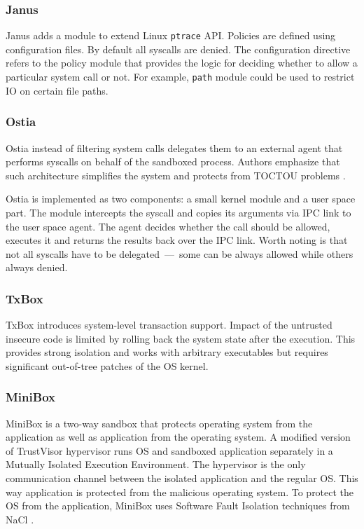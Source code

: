 \documentclass[en]{pracamgr}
\begin{document}
\subsubsection{Janus}
Janus \cite{garfinkel2004janus} adds a module to extend Linux \texttt{ptrace} API. Policies are defined using configuration files. By default all syscalls are denied. The configuration directive refers to the policy module that provides the logic for deciding whether to allow a particular system call or not. For example, \texttt{path} module could be used to restrict IO on certain file paths.

\subsubsection{Ostia}
Ostia \cite{garfinkel2004ostia} instead of filtering system calls delegates them to an external agent that performs syscalls on behalf of the sandboxed process. Authors emphasize that such architecture simplifies the system and protects from TOCTOU problems \cite{cwe_toctou}.

Ostia is implemented as two components: a small kernel module and a user space part. The module intercepts the syscall and copies its arguments via IPC link to the user space agent. The agent decides whether the call should be allowed, executes it and returns the results back over the IPC link. Worth noting is that not all syscalls have to be delegated~---~some can be always allowed while others always denied.

\subsubsection{TxBox}
TxBox \cite{jana2011txbox} introduces system-level transaction support. Impact of the untrusted insecure code is limited by rolling back the system state after the execution. This provides strong isolation and works with arbitrary executables but requires significant out-of-tree patches of the OS kernel.

\subsubsection{MiniBox}
MiniBox \cite{li2014minibox} is a two-way sandbox that protects operating system from the application as well as application from the operating system. A modified version of TrustVisor \cite{mccune2010trustvisor} hypervisor runs OS and sandboxed application separately in a Mutually Isolated Execution Environment. The hypervisor is the only communication channel between the isolated application and the regular OS. This way application is protected from the malicious operating system. To protect the OS from the application, MiniBox uses Software Fault Isolation techniques from NaCl \cite{yee2010native}.
\end{document}
